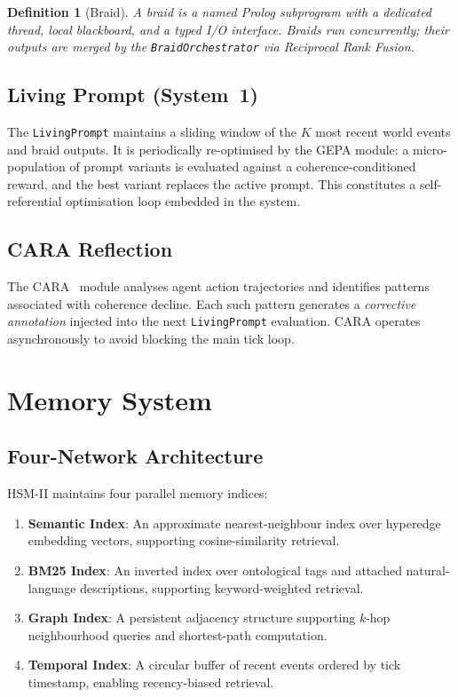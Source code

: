 \documentclass[11pt]{article}
\newtheorem{definition}{Definition}
\begin{document}
\begin{definition}[Braid]
A \emph{braid} is a named Prolog subprogram with a dedicated thread, local
blackboard, and a typed I/O interface. Braids run concurrently; their outputs
are merged by the \texttt{BraidOrchestrator} via Reciprocal Rank Fusion.
\end{definition}

\subsection{Living Prompt (System~1)}

The \texttt{LivingPrompt} maintains a sliding window of the $K$ most recent
world events and braid outputs. It is periodically re-optimised by the GEPA
module: a micro-population of prompt variants is evaluated against a
coherence-conditioned reward, and the best variant replaces the active prompt.
This constitutes a self-referential optimisation loop embedded in the system.

\subsection{CARA Reflection}

The CARA~\cite{latimer2025cara} module analyses agent action trajectories and
identifies patterns associated with coherence decline. Each such pattern
generates a \emph{corrective annotation} injected into the next \texttt{LivingPrompt}
evaluation. CARA operates asynchronously to avoid blocking the main tick loop.

\section{Memory System}
\label{sec:memory}

\subsection{Four-Network Architecture}

HSM-II maintains four parallel memory indices:

\begin{enumerate}[noitemsep,topsep=4pt]
  \item \textbf{Semantic Index}: An approximate nearest-neighbour index over
        hyperedge embedding vectors, supporting cosine-similarity retrieval.
  \item \textbf{BM25 Index}: An inverted index over ontological tags and attached
        natural-language descriptions, supporting keyword-weighted retrieval.
  \item \textbf{Graph Index}: A persistent adjacency structure supporting
        $k$-hop neighbourhood queries and shortest-path computation.
  \item \textbf{Temporal Index}: A circular buffer of recent events ordered by
        tick timestamp, enabling recency-biased retrieval.
\end{enumerate}
\end{document}
